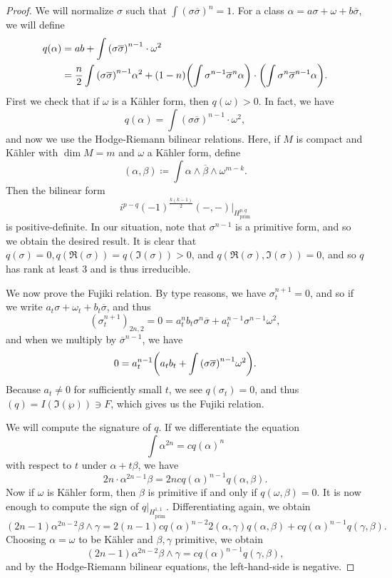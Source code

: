 \documentclass[leqno, openany]{memoir}
\theoremstyle{definition}
\theoremstyle{remark}
\theoremstyle{plain}
\theoremstyle{definition}
\theoremstyle{remark}
\newcommand{\mr}[1]{\mathrm{#1}}
\newcommand{\ol}[1]{\overline{#1}}
\begin{document}
\begin{proof}
    We will normalize $\sigma$ such that $\int {(\sigma \ol{\sigma})}^n = 1$. For a class $\alpha = a \sigma + \omega + b \ol{\sigma}$, we will define
    \begin{align*} 
        q(\alpha) &= ab + \int {(\sigma \ol{\sigma})}^{n-1} \cdot \omega^2  \\
        &= \frac{n}{2} \int {(\sigma \ol{\sigma})}^{n-1} \alpha^2 + (1-n) \qty(\int \sigma^{n-1} \ol{\sigma}^n \alpha) \cdot \qty(\int \sigma^n \ol{\sigma}^{n-1} \alpha).
    \end{align*}
    First we check that if $\omega$ is a K\"ahler form, then $q(\omega) > 0$. In fact, we have
    \[ q(\alpha) = \int {(\sigma \ol{\sigma})}^{n-1} \cdot \omega^2, \]
    and now we use the Hodge-Riemann bilinear relations. Here, if $M$ is compact and K\"ahler with $\dim M = m$ and $\omega$ a K\"ahler form, define
    \[ (\alpha, \beta) \coloneqq \int \alpha \wedge \ol{\beta} \wedge \omega^{m-k}. \]
    Then the bilinear form
    \[ i^{p-q} {(-1)}^{\frac{k(k-1)}{2}} (-,-) |_{H^{p,q}_{\mr{prim}}} \]
    is positive-definite. In our situation, note that $\sigma^{n-1}$ is a primitive form, and so we obtain the desired result. It is clear that $q(\sigma) = 0, q(\Re(\sigma)) = q(\Im(\sigma)) > 0$, and $q(\Re(\sigma), \Im(\sigma)) = 0$, and so $q$ has rank at least $3$ and is thus irreducible.

    We now prove the Fujiki relation. By type reasons, we have $\sigma_t^{n+1} = 0$, and so if we write $a_t \sigma + \omega_t + b_t {\ol{\sigma}}$, and thus
    \[ {(\sigma_t^{n+1})}_{2n,2} = 0 = a_t^n b_t \sigma^n \ol{\sigma} + a_t^{n-1} \sigma^{n-1} \omega^2, \]
    and when we multiply by $\ol{\sigma}^{n-1}$, we have
    \[ 0 = a_t^{n-1} \qty(a_t b_t + \int {(\sigma \ol{\sigma})}^{n-1} \omega^2). \]
    Because $a_t \neq 0$ for sufficiently small $t$, we see $q(\sigma_t) = 0$, and thus $(q) = I(\Im(\wp)) \ni F$, which gives us the Fujiki relation.

    We will compute the signature of $q$. If we differentiate the equation
    \[ \int \alpha^{2n} = c {q(\alpha)}^{n} \]
    with respect to $t$ under $\alpha + t \beta$, we have
    \[ 2n \cdot \alpha^{2n-1} \beta = 2n c {q(\alpha)}^{n-1} q(\alpha, \beta). \]
    Now if $\omega$ is K\"ahler form, then $\beta$ is primitive if and only if $q(\omega, \beta) = 0$. It is now enough to compute the sign of $q |_{H^{1,1}_{\mr{prim}}}$. Differentiating again, we obtain
    \[ (2n-1) \alpha^{2n-2} \beta \wedge \gamma = 2(n-1) c {q(\alpha)}^{n-2} 2(\alpha, \gamma) q(\alpha, \beta) + c {q(\alpha)}^{n-1} q(\gamma, \beta). \]
    Choosing $\alpha = \omega$ to be K\"ahler and $\beta, \gamma$ primitive, we obtain
    \[ (2n-1) \alpha^{2n-2} \beta \wedge \gamma = c {q(\alpha)}^{n-1} q(\gamma, \beta), \]
    and by the Hodge-Riemann bilinear equations, the left-hand-side is negative.


\end{proof}
\end{document}
